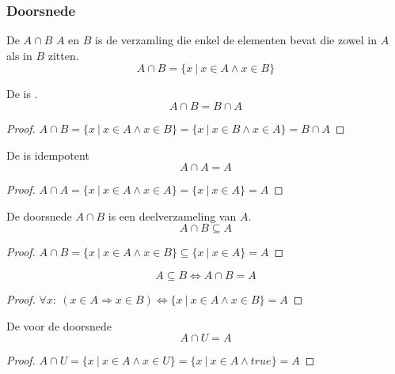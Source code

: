 \documentclass[main.tex]{subfiles}
\begin{document}
\subsubsection{Doorsnede}
\label{sec:doorsnede}

\begin{de}
  De  $A \cap B$  $A$ en $B$ is de verzamling die enkel de elementen bevat die zowel in $A$ als in $B$ zitten.
  \[ A \cap B = \{ x\ |\ x \in A \wedge x \in B\} \]
\end{de}

\begin{ei}
  De  is .
  \[ A \cap B = B \cap A \]
  \begin{proof}
    $A \cap B = \{ x\ |\ x \in A \wedge x \in B\} = \{ x\ |\ x \in B \wedge x \in A\} = B \cap A$
  \end{proof}
\end{ei}

\begin{ei}
  De  is idempotent
  \[ A \cap A = A \]
  \begin{proof}
    $A \cap A = \{ x\ |\ x \in A \wedge x \in A\} = \{ x\ |\ x \in A \} = A$
  \end{proof}
\end{ei} 

\begin{st}
  De doorsnede $A \cap B$ is een deelverzameling van $A$.
  \[ A \cap B \subseteq A \]
  \begin{proof}
    $A \cap B = \{ x\ |\ x \in A \wedge x \in B \} \subseteq \{ x\ |\ x \in A \} = A  $
  \end{proof}
\end{st}

\begin{st}
  \[ A \subseteq B \Leftrightarrow A \cap B = A \]
  \begin{proof}
    $\forall x:\ (x\in A \Rightarrow x \in B) \Leftrightarrow \{ x\ |\ x \in A \wedge x \in B \} = A$
  \end{proof}
\end{st}

\begin{st}
  De  voor de doorsnede
  \[ A \cap U = A \]
  \begin{proof}
    $A \cap U = \{ x\ |\ x \in A \wedge x \in U\} = \{ x\ |\ x \in A \wedge true \} = A$
  \end{proof}
\end{st}
\end{document}
